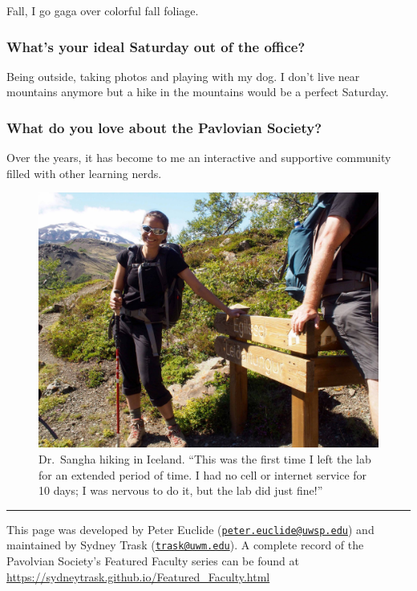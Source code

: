 \documentclass[]{article}
\begin{document}
Fall, I go gaga over colorful fall foliage.

\subsubsection{\texorpdfstring{\textbf{What's your ideal Saturday out of
the
office?}}{What's your ideal Saturday out of the office?}}\label{whats-your-ideal-saturday-out-of-the-office}

Being outside, taking photos and playing with my dog. I don't live near
mountains anymore but a hike in the mountains would be a perfect
Saturday.

\subsubsection{\texorpdfstring{\textbf{What do you love about the
Pavlovian
Society?}}{What do you love about the Pavlovian Society?}}\label{what-do-you-love-about-the-pavlovian-society}

Over the years, it has become to me an interactive and supportive
community filled with other learning nerds.

\begin{figure}
\centering
\includegraphics{./photos/Sangha_iceland.jpg}
\caption{Dr.~Sangha hiking in Iceland. ``This was the first time I left
the lab for an extended period of time. I had no cell or internet
service for 10 days; I was nervous to do it, but the lab did just
fine!''}
\end{figure}

\begin{center}\rule{0.5\linewidth}{\linethickness}\end{center}

This page was developed by Peter Euclide
(\href{mailto:peter.euclide@uwsp.edu}{\nolinkurl{peter.euclide@uwsp.edu}})
and maintained by Sydney Trask
(\href{mailto:trask@uwm.edu}{\nolinkurl{trask@uwm.edu}}). A complete
record of the Pavolvian Society's Featured Faculty series can be found
at \url{https://sydneytrask.github.io/Featured_Faculty.html}
\end{document}
